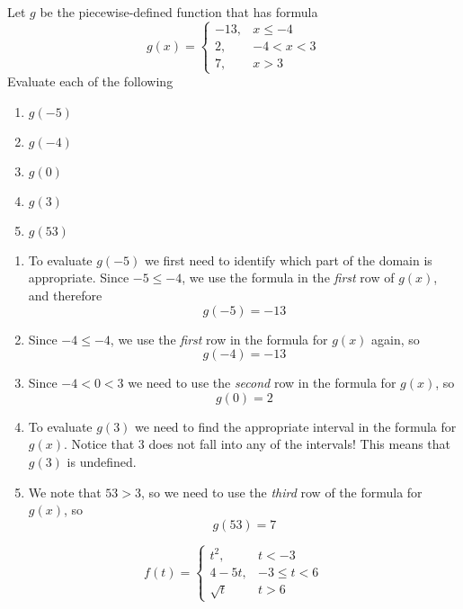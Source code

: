 \begin{pccexample}
Let $g$ be the piecewise-defined function that has formula  
\[
    g(x)=
    \begin{cases}
      -13, & x\leq -4\\
      2, & -4<x < 3\\
      7, &  x>3
    \end{cases}
\]
Evaluate each of the following
\begin{multicols}{5}
  \begin{enumerate}
    \item $g(-5)$
    \item $g(-4)$
    \item $g(0)$
    \item $g(3)$
    \item $g(53)$
  \end{enumerate}
\end{multicols}
\begin{pccsolution}
  \begin{enumerate}
    \item To evaluate $g(-5)$ we first need to identify which part of the 
      domain is appropriate. Since $-5\leq -4$, we use the formula in the 
      \emph{first} row of $g(x)$, and therefore
      \[
            g(-5)=-13
      \]
    \item Since $-4\leq -4$, we use the \emph{first} row in the formula for $g(x)$ again, so
      \[
            g(-4)=-13
      \]
    \item Since $-4<0<3$ we need to use the \emph{second} row in the formula for $g(x)$, so
      \[
            g(0)=2
      \]
    \item To evaluate $g(3)$ we need to find the appropriate interval in the formula
      for $g(x)$. Notice that $3$ does not fall into any of the intervals! This means
      that $g(3)$ is undefined.
    \item We note that $53>3$, so we need to use the \emph{third} row of the formula for $g(x)$, so
      \[
            g(53)=7
      \]
  \end{enumerate}
\end{pccsolution}
\end{pccexample}

\begin{pccexample}
  \[
        f(t)=
        \begin{cases}
          t^2, & t<-3\\
          4-5t, & -3\leq t< 6\\
          \sqrt{t} & t>6
        \end{cases}
  \]
\end{pccexample}

